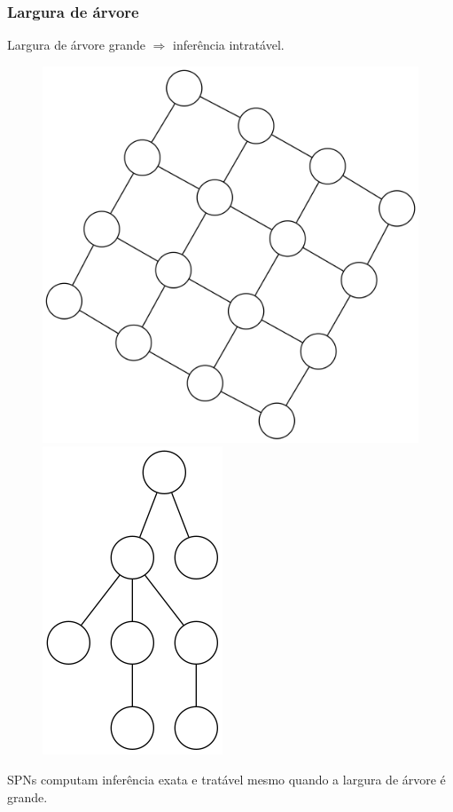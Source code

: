 \documentclass[10pt]{beamer}
\theoremstyle{plain}
\renewcommand{\implies}{\Rightarrow}
\begin{document}
\begin{frame}
  \frametitle{Largura de árvore}
  Largura de árvore grande $\implies$ inferência intratável.
  \begin{figure}[h]
    \centering\includegraphics[scale=0.2]{graphs/hightree.png}
    \includegraphics[scale=0.3]{graphs/lowtree.png}
  \end{figure}
  SPNs computam inferência exata e tratável mesmo quando a largura de árvore é grande.
\end{frame}
\end{document}
